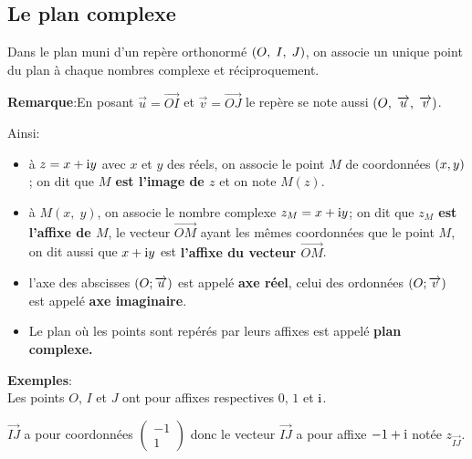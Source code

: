 \subsection*{Le plan complexe}
Dans le plan muni d'un repère orthonormé   $ \left(O,\; I, \; J\right) $, on associe un unique point  du plan à chaque nombres complexe et réciproquement.

\medskip


\textbf{Remarque}:\quad  En posant  $  \overrightarrow{u}= \overrightarrow{OI}$  et $  \overrightarrow{v}= \overrightarrow{OJ}$  le repère se note aussi  $ \left(O,\; \overrightarrow{u}, \; \overrightarrow{v}\right) $.

\medskip
 Ainsi:
\begin{itemize}
\item à $ z=x+\text{i} y $  avec $x $ et $ y$ des réels, on associe le point $ M $  de coordonnées $ \left( x, y\right) $; on dit que \textbf{$  M$ est l'image de $ z $} et on note $ M(z) $.
\item à $ M(x,\; y )$, on associe le nombre complexe $ z_M=x+\text{i} y$; on dit que \textbf{$z_M$ est l'affixe  de $ M $}, le vecteur $ \overrightarrow{OM} $ ayant les mêmes coordonnées que le point $ M $, on dit aussi  que  $ x+\text{i} y$ est \textbf{l'affixe du vecteur  $ \overrightarrow{OM} $}.
\item l'axe des abscisses $ \left( O; \overrightarrow{u} \right)$  est appelé \textbf{ axe réel}, celui des ordonnées $ \left( O; \overrightarrow{v} \right)$ est appelé \textbf{axe imaginaire}.
\item Le plan où les points sont repérés par leurs affixes est appelé \textbf{plan complexe.}
\end{itemize}


\textbf{Exemples}:\\  Les points $ O$, $ I $  et $J $ ont pour affixes respectives $0 $, $  1$  et $ \text{i}$.

\medskip

$ \overrightarrow{IJ} $ a pour coordonnées $ \begin{pmatrix}
-1\\ 1
\end{pmatrix} $  donc le vecteur $ \overrightarrow{IJ} $ a pour affixe $ -1+\text{i} $ notée $ z_{\overrightarrow{IJ} } $.

\medskip

